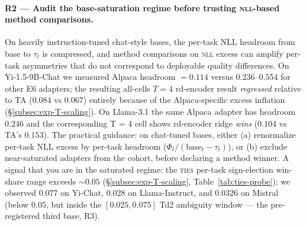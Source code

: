\paragraph{R2 --- Audit the base-saturation regime before trusting
\textsc{nll}-based method comparisons.}
On heavily instruction-tuned chat-style bases, the per-task NLL
headroom from base to $\tau_t$ is compressed, and method comparisons
on \textsc{nll} excess can amplify per-task asymmetries that do not
correspond to deployable quality differences. On Yi-1.5-9B-Chat we
measured Alpaca headroom $= 0.114$ versus $0.236$--$0.554$ for other
E6 adapters; the resulting all-cells $T = 4$ rd-encoder result
\emph{regressed} relative to TA ($0.084$ vs $0.067$) entirely because
of the Alpaca-specific excess inflation
(\S\ref{subsec:exp-T-scaling}). On Llama-3.1 the same Alpaca adapter
has headroom $0.246$ and the corresponding T = 4 cell shows rd-encoder
ridge \emph{wins} ($0.104$ vs TA's $0.153$). The practical guidance:
on chat-tuned bases, either (a) renormalize per-task NLL excess by
per-task headroom ($\Phi_t / (\mathrm{base}_t - \tau_t)$), or (b)
exclude near-saturated adapters from the cohort, before declaring a
method winner. A signal that you are in the saturated regime: the
\textsc{ties} per-task sign-election win-share range exceeds $\sim 0.05$
(\S\ref{subsec:exp-T-scaling}, Table~\ref{tab:ties-probe}); we observed
$0.077$ on Yi-Chat, $0.028$ on Llama-Instruct, and $0.0326$ on
Mistral (below $0.05$, but inside the $[0.025, 0.075]$ Td2 ambiguity
window --- the pre-registered third base, R3).

